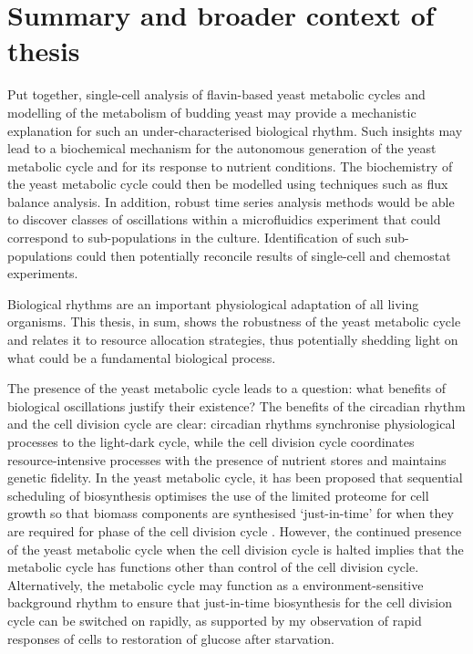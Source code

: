 \section{Summary and broader context of thesis}
\label{sec:concl-summary}

Put together, single-cell analysis of flavin-based yeast metabolic cycles and modelling of the metabolism of budding yeast may provide a mechanistic explanation for such an under-characterised biological rhythm.
Such insights may lead to a biochemical mechanism for the autonomous generation of the yeast metabolic cycle and for its response to nutrient conditions.
The biochemistry of the yeast metabolic cycle could then be modelled using techniques such as flux balance analysis.
In addition, robust time series analysis methods would be able to discover classes of oscillations within a microfluidics experiment that could correspond to sub-populations in the culture.
Identification of such sub-populations could then potentially reconcile results of single-cell and chemostat experiments.

Biological rhythms are an important physiological adaptation of all living organisms.
This thesis, in sum, shows the robustness of the yeast metabolic cycle and relates it to resource allocation strategies, thus potentially shedding light on what could be a fundamental biological process.

The presence of the yeast metabolic cycle leads to a question: what benefits of biological oscillations justify their existence?
The benefits of the circadian rhythm and the cell division cycle are clear: circadian rhythms synchronise physiological processes to the light-dark cycle, while the cell division cycle coordinates resource-intensive processes with the presence of nutrient stores and maintains genetic fidelity.
In the yeast metabolic cycle, it has been proposed that sequential scheduling of biosynthesis optimises the use of the limited proteome for cell growth \parencite{oneillEukaryoticCellBiology2020,takhaveevTemporalSegregationBiosynthetic2023} so that biomass components are synthesised `just-in-time' for when they are required for phase of the cell division cycle \parencite{zylstraMetabolicDynamicsCell2022}.
However, the continued presence of the yeast metabolic cycle when the cell division cycle is halted implies that the metabolic cycle has functions other than control of the cell division cycle.
Alternatively, the metabolic cycle may function as a environment-sensitive background rhythm to ensure that just-in-time biosynthesis for the cell division cycle can be switched on rapidly, as supported by my observation of rapid responses of cells to restoration of glucose after starvation.

